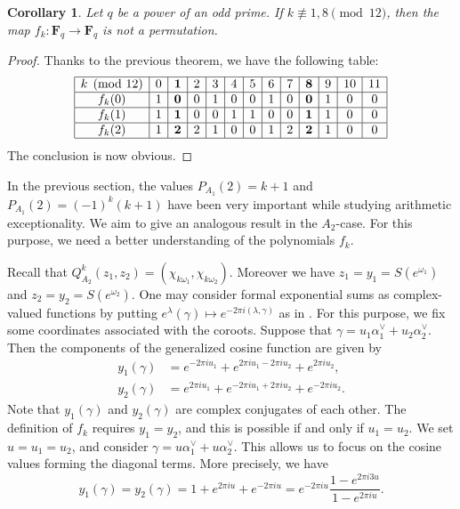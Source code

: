\documentclass{amsart}
\newcommand{\F}{\mathbf F}
\numberwithin{equation}{section}
\theoremstyle{plain}
\newtheorem{corollary}[theorem]{Corollary}
\theoremstyle{definition}
\begin{document}
\begin{corollary}\label{cor:formernotperm}
Let $q$ be a power of an odd prime. If $k\not\equiv 1,8 \pmod{12}$, then the map $f_k:\F_q\rightarrow\F_q$ is not a permutation. 
\end{corollary}
\begin{proof} Thanks to the previous theorem, we have the following table:
\[\begin{array}{|c|c|c|c|c|c|c|c|c|c|c|c|c|}\hline
	k\pmod{12} & 0 & \bf{1} & 2 & 3 & 4 & 5 & 6 & 7 & \bf{8} & 9 & 10 & 11 \\ \hline
	f_k(0)& 1 & \bf{0} & 0 & 1 & 0 & 0 & 1 & 0 & \bf{0} & 1 & 0 & 0 \\ \hline
	f_k(1)& 1 & \bf{1} & 0 & 0 & 1 & 1 & 0 & 0 & \bf{1} & 1 & 0 & 0 \\ \hline
	f_k(2)& 1 & \bf{2} & 2 & 1 & 0 & 0 & 1 & 2 & \bf{2} & 1 & 0 & 0 \\ \hline
\end{array}\]
The conclusion is now obvious.
\end{proof}

In the previous section, the values $P_{A_1}(2)=k+1$ and  $P_{A_1}(2)=(-1)^k(k+1)$ have been very important while studying arithmetic exceptionality. We aim to give an analogous result in the $A_2$-case. For this purpose, we need a better understanding of the polynomials $f_k$.

Recall that $Q^k_{A_2}(z_1,z_2)=(\chi_{k\omega_1},\chi_{k\omega_2})$. Moreover we have $z_1=y_1=S(e^{\omega_1})$ and $z_2=y_2=S(e^{\omega_2})$. One may consider formal exponential sums as complex-valued functions by putting $e^\lambda(\gamma)\mapsto e^{-2\pi i(\lambda,\gamma)}$ as in \cite[Lemma~4.1]{hoffmanwithers1988}. For this purpose, we fix some coordinates associated with the coroots. Suppose that $\gamma =u_1\alpha_1^\vee +u_2\alpha_2^\vee$. Then the components of the generalized cosine function are given by
\begin{align*}
	y_1(\gamma)&=e^{-2\pi iu_1}+e^{2\pi iu_1-2\pi iu_2}+e^{2\pi iu_2},\\
	y_2(\gamma)&=e^{2\pi iu_1}+e^{-2\pi iu_1+2\pi iu_2}+e^{-2\pi iu_2}.
\end{align*}
Note that $y_1(\gamma)$ and $y_2(\gamma)$ are complex conjugates of each other. The definition of $f_k$ requires $y_1=y_2$, and this is possible if and only if $u_1=u_2$. We set $u=u_1=u_2$, and consider $\gamma =u\alpha_1^\vee +u\alpha_2^\vee$. This allows us to focus on the cosine values forming the diagonal terms. More precisely, we have
\begin{equation}\label{eq:diag}
	y_1(\gamma)=y_2(\gamma)=1+e^{2\pi iu}+e^{-2\pi iu}=e^{-2\pi iu}\frac{1-e^{2\pi i3u}}{1-e^{2\pi iu}}.
\end{equation}
\end{document}
